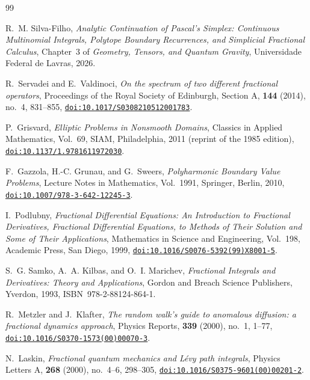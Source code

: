 \documentclass[11pt,a4paper]{article}
\theoremstyle{plain}
\theoremstyle{definition}
\theoremstyle{remark}
\numberwithin{equation}{section}
\providecommand{\doi}[1]{\href{https://doi.org/#1}{\texttt{doi:#1}}}
\begin{document}
\begin{thebibliography}{99}

 R.~M. Silva-Filho, \emph{Analytic Continuation of Pascal's Simplex: Continuous Multinomial Integrals, Polytope Boundary Recurrences, and Simplicial Fractional Calculus}, Chapter~3 of \emph{Geometry, Tensors, and Quantum Gravity}, Universidade Federal de Lavras, 2026.

R.~Servadei and E.~Valdinoci,
\emph{On the spectrum of two different fractional operators},
Proceedings of the Royal Society of Edinburgh, Section A, \textbf{144} (2014), no.~4, 831--855,
\doi{10.1017/S0308210512001783}.

P.~Grisvard,
\emph{Elliptic Problems in Nonsmooth Domains},
Classics in Applied Mathematics, Vol.~69, SIAM, Philadelphia, 2011 (reprint of the 1985 edition),
\doi{10.1137/1.9781611972030}.

F.~Gazzola, H.-C. Grunau, and G.~Sweers,
\emph{Polyharmonic Boundary Value Problems},
Lecture Notes in Mathematics, Vol.~1991, Springer, Berlin, 2010,
\doi{10.1007/978-3-642-12245-3}.

I.~Podlubny,
\emph{Fractional Differential Equations: An Introduction to Fractional Derivatives, Fractional Differential Equations, to Methods of Their Solution and Some of Their Applications},
Mathematics in Science and Engineering, Vol.~198, Academic Press, San Diego, 1999,
\doi{10.1016/S0076-5392(99)X8001-5}.

S.~G. Samko, A.~A. Kilbas, and O.~I. Marichev,
\emph{Fractional Integrals and Derivatives: Theory and Applications},
Gordon and Breach Science Publishers, Yverdon, 1993, ISBN~978-2-88124-864-1.

R.~Metzler and J.~Klafter,
\emph{The random walk's guide to anomalous diffusion: a fractional dynamics approach},
Physics Reports, \textbf{339} (2000), no.~1, 1--77,
\doi{10.1016/S0370-1573(00)00070-3}.

N.~Laskin,
\emph{Fractional quantum mechanics and L\'evy path integrals},
Physics Letters A, \textbf{268} (2000), no.~4--6, 298--305,
\doi{10.1016/S0375-9601(00)00201-2}.

\end{thebibliography}
\end{document}
